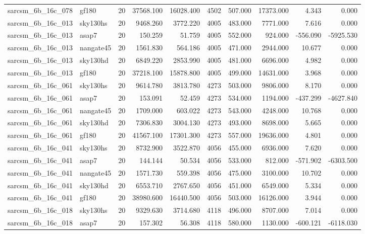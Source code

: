 \begin{longtable}{llrrrrrrrr}
sarcsm\_6b\_16c\_078 & gf180 & 20 & 37568.100 & 16028.400 & 4502 & 507.000 & 17373.000 & 4.343 & 0.000 \\
sarcsm\_6b\_16c\_013 & sky130hs & 20 & 9468.260 & 3772.220 & 4005 & 483.000 & 7771.000 & 7.616 & 0.000 \\
sarcsm\_6b\_16c\_013 & asap7 & 20 & 150.259 & 51.759 & 4005 & 552.000 & 924.000 & -556.090 & -5925.530 \\
sarcsm\_6b\_16c\_013 & nangate45 & 20 & 1561.830 & 564.186 & 4005 & 471.000 & 2944.000 & 10.677 & 0.000 \\
sarcsm\_6b\_16c\_013 & sky130hd & 20 & 6849.220 & 2853.990 & 4005 & 481.000 & 6696.000 & 4.982 & 0.000 \\
sarcsm\_6b\_16c\_013 & gf180 & 20 & 37218.100 & 15878.800 & 4005 & 499.000 & 14631.000 & 3.968 & 0.000 \\
sarcsm\_6b\_16c\_061 & sky130hs & 20 & 9614.780 & 3813.780 & 4273 & 503.000 & 9806.000 & 8.170 & 0.000 \\
sarcsm\_6b\_16c\_061 & asap7 & 20 & 153.091 & 52.459 & 4273 & 534.000 & 1194.000 & -437.299 & -4627.840 \\
sarcsm\_6b\_16c\_061 & nangate45 & 20 & 1709.000 & 603.022 & 4273 & 543.000 & 4248.000 & 10.768 & 0.000 \\
sarcsm\_6b\_16c\_061 & sky130hd & 20 & 7306.830 & 3004.130 & 4273 & 493.000 & 8698.000 & 5.665 & 0.000 \\
sarcsm\_6b\_16c\_061 & gf180 & 20 & 41567.100 & 17301.300 & 4273 & 557.000 & 19636.000 & 4.801 & 0.000 \\
sarcsm\_6b\_16c\_041 & sky130hs & 20 & 8732.900 & 3522.870 & 4056 & 455.000 & 6936.000 & 7.620 & 0.000 \\
sarcsm\_6b\_16c\_041 & asap7 & 20 & 144.144 & 50.534 & 4056 & 533.000 & 812.000 & -571.902 & -6303.500 \\
sarcsm\_6b\_16c\_041 & nangate45 & 20 & 1571.730 & 559.398 & 4056 & 475.000 & 3100.000 & 10.702 & 0.000 \\
sarcsm\_6b\_16c\_041 & sky130hd & 20 & 6553.710 & 2767.650 & 4056 & 451.000 & 6549.000 & 5.334 & 0.000 \\
sarcsm\_6b\_16c\_041 & gf180 & 20 & 38980.600 & 16440.500 & 4056 & 503.000 & 16126.000 & 3.944 & 0.000 \\
sarcsm\_6b\_16c\_018 & sky130hs & 20 & 9329.630 & 3714.680 & 4118 & 496.000 & 8707.000 & 7.014 & 0.000 \\
sarcsm\_6b\_16c\_018 & asap7 & 20 & 157.302 & 56.308 & 4118 & 580.000 & 1130.000 & -600.121 & -6118.030 \\

\end{longtable}
